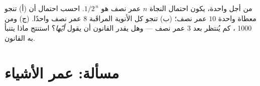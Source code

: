 \begin{exercise}[$\star\star\star$]\label{exo:g12:radioactive-decay:15}
من أجل  واحدة، يكون احتمال النجاة $n$ عمر نصف هو
$1/2^{\,n}$. احسب احتمال أن (أ) تنجو  معطاة واحدة
$10$ عمر نصف؛ (ب) تنجو كل الأنوية المراقَبة $8$ عمر نصف واحدًا.
(ج) ومن \num{1000} ، كم يُنتظر بعد $3$ عمر نصف ---
وهل يقدر القانون أن يقول \emph{أيّها}؟ استنتج ماذا يتنبأ به القانون.
\end{exercise}

\section{مسألة: عمر الأشياء}

